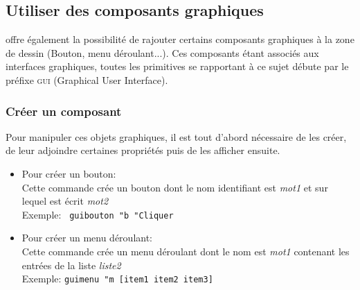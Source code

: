 \subsection{Utiliser des composants graphiques}
\xlogo offre également la possibilité de rajouter certains composants graphiques à la zone de dessin (Bouton, menu déroulant...). Ces composants étant associés aux interfaces graphiques, toutes les primitives se rapportant à ce sujet débute par le préfixe \og \textsc{gui} \fg (Graphical User Interface).
\subsubsection{Créer un composant}
Pour manipuler ces objets graphiques, il est tout d'abord nécessaire de les créer, de leur adjoindre certaines propriétés puis de les afficher ensuite.
\begin{itemize}
 \item Pour créer un bouton:\\
Cette commande crée un bouton dont le nom identifiant est \textit{mot1} et sur lequel est écrit \textit{mot2}\\
Exemple: \texttt{ guibouton "b "Cliquer}
 \item Pour créer un menu déroulant:\\
Cette commande crée un menu déroulant dont le nom est \textit{mot1} contenant les entrées de la liste \textit{liste2}\\
Exemple: \texttt{guimenu "m [item1 item2 item3]}
\end{itemize}
